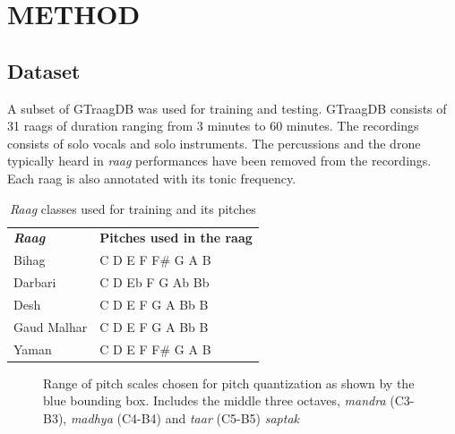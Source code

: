 \documentclass[letterpaper, 10 pt, conference]{ieeeconf}  %
\begin{document}
\section{METHOD}

\subsection{Dataset}
A subset of GTraagDB \cite{c2} was used for training and testing. GTraagDB consists of 31 raags of duration ranging from 3 minutes to 60 minutes. The recordings consists of solo vocals and solo instruments. The percussions and the drone typically heard in \textit{raag} performances have been removed from the recordings. Each raag is also annotated with its tonic frequency.

\begin{table}[h]
\centering
\caption{\textit{Raag} classes used for training and its pitches}
\label{raag_class}
\begin{tabular}{ll}
\textit{\textbf{Raag}} & \textbf{Pitches used in the raag} \\
Bihag                  & C D E F F\# G A B                 \\
Darbari                & C D Eb F G Ab Bb                  \\
Desh                   & C D E F G A Bb B                  \\
Gaud Malhar            & C D E F G A Bb B                  \\
Yaman                  & C D E F F\# G A B                 
\end{tabular}
\end{table}

   \begin{figure}[thpb]
      \centering
      \caption{Range of pitch scales chosen for pitch quantization as shown by the blue bounding box. Includes the middle three octaves, \textit{mandra} (C3-B3), \textit{madhya} (C4-B4) and \textit{taar} (C5-B5) \textit{saptak}}
      \label{figurelabel}
   \end{figure}
   
\end{document}
